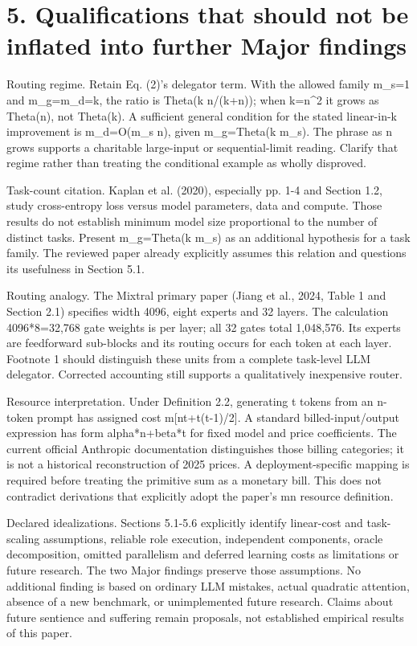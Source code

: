 \documentclass[10pt]{article}
\begin{document}
\section*{5. Qualifications that should not be inflated into further Major findings}
Routing regime. Retain Eq. (2)’s delegator term. With the allowed family m\_s=1 and m\_g=m\_d=k, the ratio is Theta(k n/(k+n)); when k=n\textasciicircum{}2 it grows as Theta(n), not Theta(k). A sufficient general condition for the stated linear-in-k improvement is m\_d=O(m\_s n), given m\_g=Theta(k m\_s). The phrase as n grows supports a charitable large-input or sequential-limit reading. Clarify that regime rather than treating the conditional example as wholly disproved.\par
Task-count citation. Kaplan et al. (2020), especially pp. 1-4 and Section 1.2, study cross-entropy loss versus model parameters, data and compute. Those results do not establish minimum model size proportional to the number of distinct tasks. Present m\_g=Theta(k m\_s) as an additional hypothesis for a task family. The reviewed paper already explicitly assumes this relation and questions its usefulness in Section 5.1.\par
Routing analogy. The Mixtral primary paper (Jiang et al., 2024, Table 1 and Section 2.1) specifies width 4096, eight experts and 32 layers. The calculation 4096*8=32,768 gate weights is per layer; all 32 gates total 1,048,576. Its experts are feedforward sub-blocks and its routing occurs for each token at each layer. Footnote 1 should distinguish these units from a complete task-level LLM delegator. Corrected accounting still supports a qualitatively inexpensive router.\par
Resource interpretation. Under Definition 2.2, generating t tokens from an n-token prompt has assigned cost m[nt+t(t-1)/2]. A standard billed-input/output expression has form alpha*n+beta*t for fixed model and price coefficients. The current official Anthropic documentation distinguishes those billing categories; it is not a historical reconstruction of 2025 prices. A deployment-specific mapping is required before treating the primitive sum as a monetary bill. This does not contradict derivations that explicitly adopt the paper’s mn resource definition.\par
Declared idealizations. Sections 5.1-5.6 explicitly identify linear-cost and task-scaling assumptions, reliable role execution, independent components, oracle decomposition, omitted parallelism and deferred learning costs as limitations or future research. The two Major findings preserve those assumptions. No additional finding is based on ordinary LLM mistakes, actual quadratic attention, absence of a new benchmark, or unimplemented future research. Claims about future sentience and suffering remain proposals, not established empirical results of this paper.\par
\end{document}
